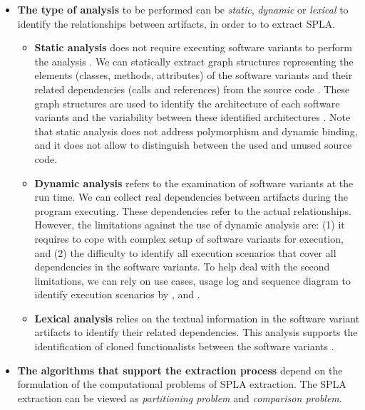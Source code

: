 \documentclass[graybox]{svmult}
\begin{document}
\begin{itemize}
	\item \textbf{The type of analysis} to be performed  can be \textit{static}, \textit{dynamic} or \textit{lexical} to identify the relationships between artifacts, in order to to extract SPLA.

    \begin{itemize}
	    \item \textbf{Static analysis} does not require executing software variants to perform the analysis  \cite{pinzger2004architecture,shatnawi2017recovering,Weinreich2012}. We can statically extract graph structures representing the elements (classes, methods, attributes) of the software variants and their related dependencies (calls and references) from the source code \cite{shatnawi2017analyzing}. These graph structures are used to identify the architecture of each software variants and the variability between these identified architectures \cite{pinzger2004architecture,shatnawi2017recovering}. Note that static analysis does not address polymorphism and dynamic binding, and it does not allow to distinguish between the used and unused source code. 
	
	    \item \textbf{Dynamic analysis} refers to the examination of software variants at the run time. We can collect real dependencies between  artifacts during the program executing. These dependencies refer to the actual relationships. However, the limitations against the use of dynamic analysis are: (1) it requires to cope with complex setup of software variants for execution, and (2) the difficulty to identify  all execution scenarios that cover all dependencies in the software variants. To help deal with the second limitations, we can rely on use cases, usage log and sequence diagram to identify execution scenarios by \cite{allier2009identifying}, \cite{Dugerdil:2013:DDT:2480362.2480602} and \cite{mishra2009creating}. 

    	\item \textbf{Lexical analysis} relies on the textual information in the software variant artifacts to identify their related dependencies. This analysis supports the identification of cloned functionalists between the software variants \cite{frenzel2007extending,kolb2005case,kolb2006refactoring,koschke2009extending,mende2008supporting,mende2009evaluation}. 
    \end{itemize}

	\item \textbf{The algorithms that support the extraction process} depend on the formulation of the computational problems of SPLA extraction. The SPLA extraction can be viewed as \textit{partitioning problem} and \textit{comparison problem}.	
	

\end{itemize}
\end{document}
